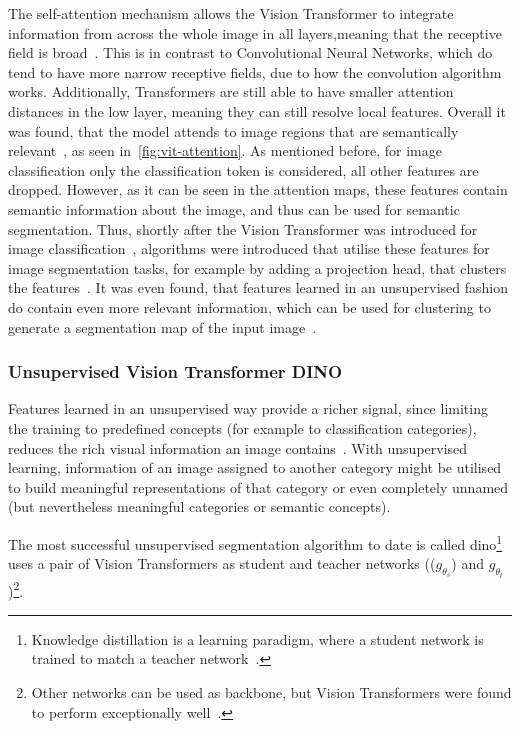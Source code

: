 The self-attention mechanism allows the Vision Transformer to integrate information from across the whole image in all layers,meaning that the receptive field is broad~\autocite{Dosovitskiy2021}.
This is in contrast to Convolutional Neural Networks, which do tend to have more narrow receptive fields, due to how the convolution algorithm works.
Additionally, Transformers are still able to have smaller attention distances in the low layer, meaning they can still resolve local features.
Overall it was found, that the model attends to image regions that are semantically relevant~\autocite{Dosovitskiy2021}, as seen in~\autoref{fig:vit-attention}.
As mentioned before, for image classification only the classification token is considered, all other features are dropped.
However, as it can be seen in the attention maps, these features contain semantic information about the image, and thus can be used for semantic segmentation.
Thus, shortly after the Vision Transformer was introduced for image classification~\autocite{Dosovitskiy2021}, algorithms were introduced that utilise these features for image segmentation tasks, for example by adding a projection head, that clusters the features~\autocite{Caron2021}.
It was even found, that features learned in an unsupervised fashion do contain even more relevant information, which can be used for clustering to generate a segmentation map of the input image~\autocite{Caron2021}.

 \subsubsection{Unsupervised Vision Transformer DINO}
Features learned in an unsupervised way provide a richer signal, since limiting the training to predefined concepts (for example to classification categories), reduces the rich visual information an image contains~\autocite{Caron2021}.
With unsupervised learning, information of an image assigned to another category might be utilised to build meaningful representations of that category or even completely unnamed (but nevertheless meaningful categories or semantic concepts).%

The most successful unsupervised segmentation algorithm to date is called \gls{dino}\footnote{Knowledge distillation is a learning paradigm, where a student network is trained to match a teacher network~\autocite{Caron2021}.} uses a pair of Vision Transformers as student and teacher networks (($g_{\theta_s}$) and $g_{\theta_t}$)\footnote{Other networks can be used as backbone, but Vision Transformers were found to perform exceptionally well~\autocite{Caron2021}.}.

